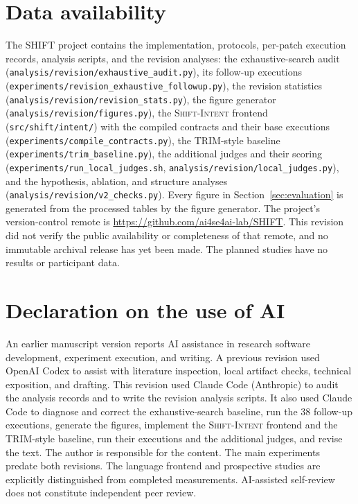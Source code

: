 \documentclass[a4paper,fleqn]{cas-sc}
\newcommand{\dsl}{\textsc{Shift-Intent}}
\begin{document}
\section*{Data availability}
The SHIFT project contains the implementation, protocols, per-patch execution records, analysis scripts, and the revision analyses: the exhaustive-search audit (\nolinkurl{analysis/revision/exhaustive_audit.py}), its follow-up executions (\nolinkurl{experiments/revision_exhaustive_followup.py}), the revision statistics (\nolinkurl{analysis/revision/revision_stats.py}), the figure generator (\nolinkurl{analysis/revision/figures.py}), the \dsl{} frontend (\nolinkurl{src/shift/intent/}) with the compiled contracts and their base executions (\nolinkurl{experiments/compile_contracts.py}), the TRIM-style baseline (\nolinkurl{experiments/trim_baseline.py}), the additional judges and their scoring (\nolinkurl{experiments/run_local_judges.sh}, \nolinkurl{analysis/revision/local_judges.py}), and the hypothesis, ablation, and structure analyses (\nolinkurl{analysis/revision/v2_checks.py}). Every figure in Section~\ref{sec:evaluation} is generated from the processed tables by the figure generator. The project's version-control remote is \url{https://github.com/ai4se4ai-lab/SHIFT}. This revision did not verify the public availability or completeness of that remote, and no immutable archival release has yet been made. The planned studies have no results or participant data.

\section*{Declaration on the use of AI}
An earlier manuscript version reports AI assistance in research software development, experiment execution, and writing. A previous revision used OpenAI Codex to assist with literature inspection, local artifact checks, technical exposition, and drafting. This revision used Claude Code (Anthropic) to audit the analysis records and to write the revision analysis scripts. It also used Claude Code to diagnose and correct the exhaustive-search baseline, run the 38 follow-up executions, generate the figures, implement the \dsl{} frontend and the TRIM-style baseline, run their executions and the additional judges, and revise the text. The author is responsible for the content. The main experiments predate both revisions. The language frontend and prospective studies are explicitly distinguished from completed measurements. AI-assisted self-review does not constitute independent peer review.



\end{document}
